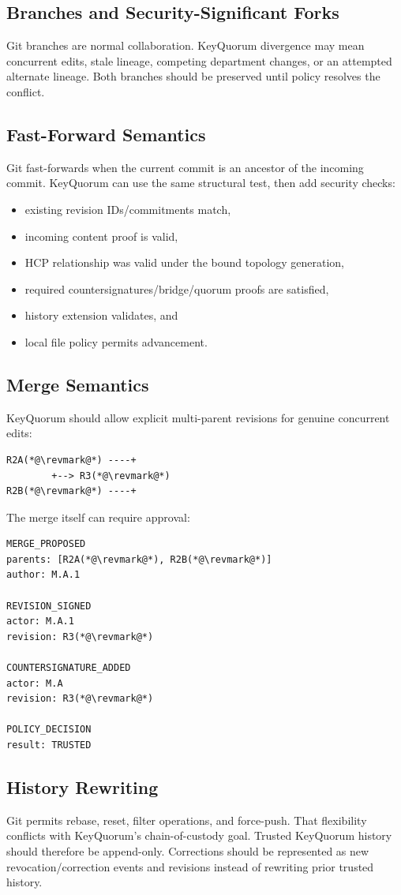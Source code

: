 \documentclass[11pt]{article}
\begin{document}
\subsection{Branches and Security-Significant Forks}
Git branches are normal collaboration. KeyQuorum divergence may mean concurrent edits, stale lineage, competing department changes, or an attempted alternate lineage. Both branches should be preserved until policy resolves the conflict.

\subsection{Fast-Forward Semantics}
Git fast-forwards when the current commit is an ancestor of the incoming commit. KeyQuorum can use the same structural test, then add security checks:
\begin{itemize}[leftmargin=1.5em]
  \item existing revision IDs/commitments match,
  \item incoming content proof is valid,
  \item HCP relationship was valid under the bound topology generation,
  \item required countersignatures/bridge/quorum proofs are satisfied,
  \item history extension validates, and
  \item local file policy permits advancement.
\end{itemize}

\subsection{Merge Semantics}
KeyQuorum should allow explicit multi-parent revisions for genuine concurrent edits:
\begin{lstlisting}
R2A(*@\revmark@*) ----+
        +--> R3(*@\revmark@*)
R2B(*@\revmark@*) ----+
\end{lstlisting}
The merge itself can require approval:
\begin{lstlisting}
MERGE_PROPOSED
parents: [R2A(*@\revmark@*), R2B(*@\revmark@*)]
author: M.A.1

REVISION_SIGNED
actor: M.A.1
revision: R3(*@\revmark@*)

COUNTERSIGNATURE_ADDED
actor: M.A
revision: R3(*@\revmark@*)

POLICY_DECISION
result: TRUSTED
\end{lstlisting}

\subsection{History Rewriting}
Git permits rebase, reset, filter operations, and force-push. That flexibility conflicts with KeyQuorum's chain-of-custody goal. Trusted KeyQuorum history should therefore be append-only. Corrections should be represented as new revocation/correction events and revisions instead of rewriting prior trusted history.
\end{document}
